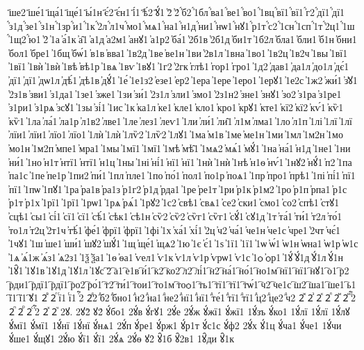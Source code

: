 {҃ше2
҃ше́1
҃ща́1
҃ще́1
҃ы́1н
҃є́2
҃є́н1
҃і́1
҃ѣ́2
҃ꙋ́1
҆2̀
҆2́
҆́б2
҆́1бл
҆́ва1
҆́ве1
҆́во1
҆́1вц
҆́вї1
҆́вї1
҆́г2
҆́дї1
҆́дї1
҆́з1д
҆́зе1
҆́з1н
҆́1зр
҆́и1
҆́1к
҆́2л
҆́л1ч
҆́мо1
҆́мѧ1
҆́на1
҆́н1д
҆́ни1
҆́нѡ1
҆́нꙋ1
҆́р1т
҆́с2
҆́1сн
҆́1сп
҆́1т
҆́2ц1
҆́1ш
҆́1щ2
҆́ю1
҆2̑
҆1а
҆а́1к
҆а̑1
҆а1д
҆а2м1
҆анꙋ1
҆а1р2
҆ба́1
҆2б1в
҆2б1д
҆би1т
҆1б2л
҆бла1
҆бли1
҆б1н
҆бни1
҆бол1
҆бре1
҆1бщ
҆бѡ́1
҆в1в
҆вва1
҆1в2д
҆1ве
҆ве1н
҆1ви
҆2в1л
҆1вна
҆1во1
҆1в2ц
҆1в2ч
҆1вы
҆1вї1
҆1вї1
҆1вѝ
҆1вѝ
҆1вѣ
҆вѣ1р
҆1вѧ
҆1вѵ
҆1вꙋ1
҆1г2
҆2гк
҆глѣ1
҆гор1
҆гро1
҆1д2
҆дав1
҆да1л
҆до1л
҆дє́1
҆дї1
҆дї1
҆дѡ1л
҆дѣ́1
҆дѣ1в
҆дꙋ́1
҆1е́
҆1е1з2
҆езе1
҆ер2
҆1ера
҆1ере
҆1еро1
҆1ерꙋ1
҆1е2с
҆1ж2
҆жи́1
҆з̾ꙋ1
҆2з1в
҆зви1
҆з1да1
҆1зе1
҆зже1
҆1зи
҆зи́1
҆2з1л
҆зли1
҆змо1
҆2з1н2
҆зне1
҆знꙋ1
҆зо2
҆з1ра
҆з1ре1
҆з1ри1
҆з1рѧ
҆зсꙋ1
҆1зы
҆зі́1
҆1ис
҆1к
҆ка1л
҆ке1
҆кле1
҆кло1
҆кро1
҆крꙋ1
҆кте1
҆кї2
҆кї2
҆кѵ́1
҆кѷ1
҆кѷ1
҆1ла
҆ла́1
҆ла1р
҆л1в2
҆лве1
҆1ле
҆лез1
҆леѵ1
҆1ли
҆ли́1
҆ли̑1
҆л1м
҆лма1
҆1ло
҆л1п
҆1лі
҆1лї
҆1лї
҆лїи1
҆лїи1
҆лїо1
҆лїо1
҆1лѝ
҆1лѝ
҆1лѷ2
҆1лѷ2
҆1лꙋ1
҆1ма
҆м1в
҆1ме
҆ме1н
҆1ми
҆1мл
҆1м2н
҆1мо
҆мо1н
҆1м2п
҆мпе1
҆мра1
҆1мы
҆1мї1
҆1мї1
҆1мѣ
҆мѣ̑1
҆1мѧ2
҆мѧ́1
҆мꙋ́1
҆1на
҆на́1
҆н1д
҆1не1
҆1ни
҆ни́1
҆1но
҆н1т
҆нтї1
҆нтї1
҆н1ц
҆1ны
҆1ні
҆ні́1
҆нї1
҆нї1
҆1нѝ
҆1нѝ
҆1нѣ
҆н1ѳ
҆нѵ́1
҆1нꙋ2
҆нꙋ́1
҆п2
҆1па
҆па1с
҆1пе
҆пе1р
҆1пи2
҆пи́1
҆1пл
҆пле1
҆1по
҆по́1
҆пол1
҆по1р
҆поѧ1
҆1пр
҆про1
҆прѣ1
҆1пі
҆пі́1
҆пї1
҆пї1
҆1пѡ
҆1пꙋ1
҆1ра
҆ра1в
҆ра1з
҆р1г2
҆р1д
҆рда1
҆1ре
҆ре1т
҆1ри
҆р1к
҆р1м2
҆1ро
҆р1п
҆рпа1
҆р1с
҆р1т
҆р1х
҆1рї1
҆1рї1
҆1рѡ1
҆1рѧ
҆рѧ́1
҆1рꙋ2
҆1с2
҆свѣ1
҆свѧ1
҆се2
҆ски1
҆смо1
҆со2
҆спѣ1
҆стꙋ1
҆сцѣ1
҆сы1
҆сі́1
҆сї1
҆сї1
҆сѣ́1
҆сѣк1
҆сѣ1н
҆сѷ2
҆сѷ2
҆сѷг1
҆сѷг1
҆сꙋ́1
҆сꙋ1д
҆1т
҆та́1
҆ти́1
҆т2л
҆то́1
҆то1л
҆т2ц
҆2т1ч
҆тѣ́1
҆фе́1
҆фрї1
҆фрї1
҆1фі
҆1х
҆ха́1
҆хі́1
҆2ц
҆ч2
҆ча́1
҆че1н
҆че1с
҆чре1
҆2чт
҆чє́1
҆1чꙋ1
҆1ш
҆ше1
҆ши́1
҆шꙋ2
҆шꙋ́1
҆1щ
҆ще́1
҆щѧ2
҆1ю
҆1є
҆є́1
҆1ѕ
҆1ї1
҆1ї1
҆1ѡ
҆ѡ́1
҆ѡ1н
҆ѡна1
҆ѡ1р
҆ѡ1с
҆1ѧ
҆ѧ́1ж
҆ѧ́з1
҆ѧ2з1
҆1ѯ
҆ѯа1
҆1ѳ
҆ѳа1
҆ѵел1
҆ѵ1к
҆ѵ1л
҆ѵ1р
҆ѵрѡ1
҆ѵ1с
҆1ѻ
҆ѻр1
҆1ꙋ́
҆ꙋ́1д
҆ꙋ́1л
҆ꙋ́1н
҆1ꙋ̑1
҆1ꙋ1в
҆1ꙋ1д
҆1ꙋ1л
҆1ꙋс
҇2
҇а1
҇е1в
҇и́1
҇к2
҇ко2
҇л2
҇лі́1
҇н2
҇на́1
҇но́1
҇но1м
҇нї1
҇нї1
҇нꙋ1
҇о1
҇р2
҇рди1
҇рдї1
҇рдї1
҇ро2
҇ро́1
҇т2
҇ти́1
҇тои1
҇то1м
҇тоѻ1
҇ть1
҇тї1
҇тї1
҇тѡ́1
҇ч2
҇че1с
҇ш2
҇ша1
҇ше1
҇ь1
҇ї1
҇ї1
҇ꙋ1
2ⷡ
2ⷢ
ⷢї1
ⷢї1
ⷢ҇2
2ⷣ2
ⷣб2
ⷣбно1
ⷣн2
ⷣна1
ⷣне2
ⷣнї1
ⷣнї1
ⷣте́1
ⷣтї1
ⷣтї1
ⷣц2
ⷣце2
ⷣч2
2ⷤ
2ⷥ
2ⷦ
2ⷧ
2ⷨ
2ⷩ
ⷪ҇2
2ⷫ
2ⷬ
2ⷭ
ⷭ҇2
2ⷯ
2ⷱ
2ꙋ.
2ꙋ2̀
ꙋ2́
ꙋ́бо1
2ꙋ́в
ꙋ́гꙋ1
2ꙋ́е
2ꙋ́ж
ꙋ́жї1
ꙋ́жї1
1ꙋ́зъ
ꙋ́ко1
1ꙋ́лї
1ꙋ́лї
1ꙋ́лꙋ
ꙋ́мї1
ꙋ́мї1
1ꙋ́нї
1ꙋ́нї
ꙋ́нѧ1
2ꙋ́п
ꙋ́ре1
ꙋ́рж1
ꙋ́р1т
ꙋ́с1с
ꙋ́ф2
2ꙋ́х
ꙋ́1ц
ꙋ́ча1
ꙋ́че1
1ꙋ́чи
ꙋ́ше1
ꙋ́щꙋ1
2ꙋ́ю
ꙋ́ї1
ꙋ́ї1
2ꙋ́ѧ
2ꙋ́ѳ
ꙋ2̑
ꙋ̑1б
ꙋ̑2в1
1ꙋ̑ди
ꙋ̑1к
}
